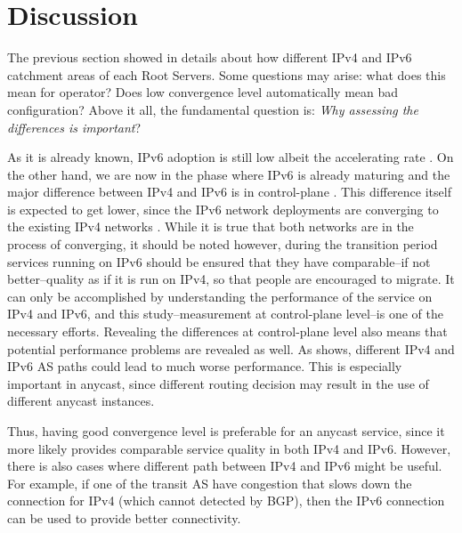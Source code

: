 \section{Discussion}
\label{ch04:discussion}
The previous section showed in details about how different IPv4 and IPv6 catchment areas of each Root Servers. Some questions may arise: what does this mean for operator? Does low convergence level automatically mean bad configuration? Above it all, the fundamental question is: \textit{Why assessing the differences is important}? 

As it is already known, IPv6 adoption is still low albeit the accelerating rate \cite{Czyz:2014:MIA:2619239.2626295}. On the other hand, we are now in the phase where IPv6 is already maturing and the major difference between IPv4 and IPv6 is in control-plane \cite{7182788}. This difference itself is expected to get lower, since the IPv6 network deployments are converging to the existing IPv4 networks \cite{Dhamdhere:2012:MDI:2398776.2398832}. While it is true that both networks are in the process of converging, it should be noted however, during the transition period services running on IPv6 should be ensured that they have comparable--if not better--quality as if it is run on IPv4, so that people are encouraged to migrate. It can only be accomplished by understanding the performance of the service on IPv4 and IPv6, and this study--measurement at control-plane level--is one of the necessary efforts. Revealing the differences at control-plane level also means that potential performance problems are revealed as well. As \cite{Dhamdhere:2012:MDI:2398776.2398832} shows, different IPv4 and IPv6 AS paths could lead to much worse performance. This is especially important in anycast, since different routing decision may result in the use of different anycast instances. 

Thus, having good convergence level is preferable for an anycast service, since it more likely provides comparable service quality in both IPv4 and IPv6. However, there is also cases where different path between IPv4 and IPv6 might be useful. For example, if one of the transit AS have congestion that slows down the connection for IPv4 (which cannot detected by BGP), then the IPv6 connection can be used to provide better connectivity.





